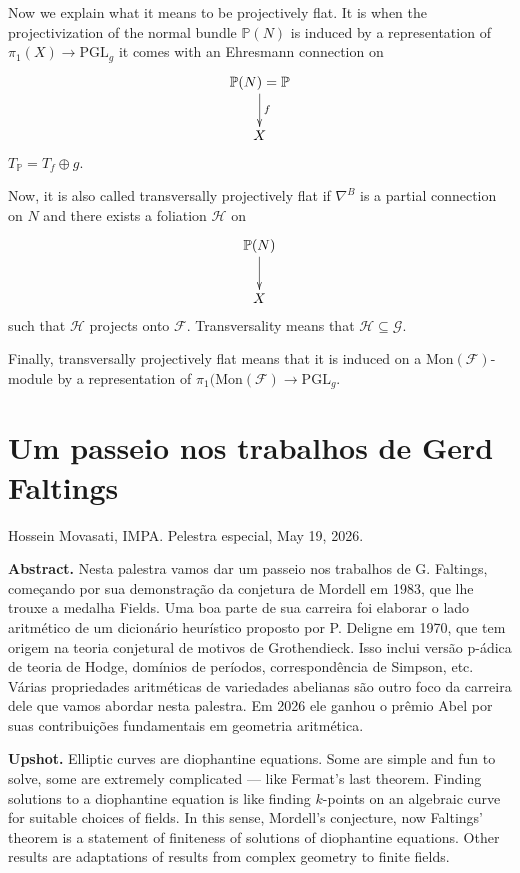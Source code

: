 \medskip\noindent
Now we explain what it means to be
projectively flat.
It is when the projectivization of the normal
bundle $\mathbb{P}(N)$
is induced by a representation of $\pi_1(X)
\to \text{PGL}_g$
it comes with an Ehresmann connection on
$$
\xymatrix{
\mathbb{P}(N)=\mathbb{P}\ar[d]^{f}\\
X
}
$$
$T_{\mathbb{P}}=T_f \oplus g$.

Now, it is also called transversally
projectively flat
if $\nabla^B$ is a partial connection on $N$
and there exists a foliation $\mathcal{H}$ on
$$
\xymatrix{
\mathbb{P}(N)\ar[d]\\ X
}
$$
such that $\mathcal{H}$ projects onto
$\mathcal{F}$.
Transversality means that $\mathcal{H}
\subseteq \mathcal{G}$.

Finally, transversally projectively flat
means that
it is induced on a
$\text{Mon}(\mathcal{F})$-module
by a representation of
$\pi_1(\text{Mon}(\mathcal{F}) \to
\text{PGL}_g$.

\section{Um passeio nos trabalhos de
Gerd Faltings}
\label{section-faltings}

\noindent
Hossein Movasati, IMPA.
Pelestra especial,
May 19, 2026.

\medskip\noindent
{\bf Abstract.}
Nesta palestra vamos dar um passeio nos
trabalhos de G. Faltings, começando por sua
demonstração da conjetura de Mordell em
1983, que lhe trouxe a medalha Fields. Uma
boa parte de sua carreira foi elaborar o
lado aritmético de um dicionário heurístico
proposto por P. Deligne em 1970, que tem
origem na teoria conjetural de motivos de
Grothendieck. Isso inclui versão p-ádica de
teoria de Hodge, domínios de períodos,
correspondência de Simpson, etc. Várias
propriedades aritméticas de variedades
abelianas são outro foco da carreira dele
que vamos abordar nesta palestra. Em 2026
ele ganhou o prêmio Abel por suas
contribuições fundamentais em geometria
aritmética.

\medskip\noindent
{\bf Upshot.} 
Elliptic curves are diophantine equations.
Some are simple and fun to solve,
some are extremely complicated ---
like Fermat's last theorem.
Finding solutions to a diophantine
equation is like finding $k$-points
on an algebraic curve for suitable
choices of fields.
In this sense,
Mordell's conjecture, now Faltings'
theorem is a statement of finiteness
of solutions of diophantine equations.
Other results are adaptations
of results from complex geometry
to finite fields.

